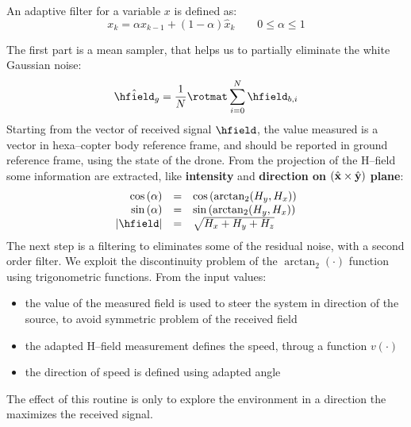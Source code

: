 An adaptive filter for a variable $x$ is defined as:
\[
x_k = \alpha x_{k-1} + (1-\alpha) \hat{x}_k \qquad 0 \leq \alpha \leq 1
\]

The first part is a mean sampler, that helps us to partially eliminate the white Gaussian noise:
\begin{equation}
	\hat{\hfield}_g = \dfrac{1}{N} \rotmat \sum\limits_{i=0}^{N} \hfield_{b,i}
\end{equation}
Starting from the vector of received signal $\hfield$, the value measured is a vector in hexa--copter body reference frame, and should be reported in ground reference frame, using the state of the drone. From the projection of the H--field some information are extracted, like \textbf{intensity} and \textbf{direction on} $(\hat{\mathbf{x}}\times\hat{\mathbf{y}})$ \textbf{plane}:
\begin{equation}
\begin{array}{rcl}
	\ccos{\alpha} & = & \ccos{\arctan_2(H_y,H_x)} \\
	\ssin{\alpha} & = & \ssin{\arctan_2(H_y,H_x)} \\
	\abs{\hfield} & = & \sqrt{H_x+H_y+H_z}
\end{array}
\end{equation}
The next step is a filtering to eliminates some of the residual noise, with a second order filter. We exploit the discontinuity problem of the ${\arctan_2(\cdot)}$ function using trigonometric functions. From the input values:
\begin{itemize}
\item the value of the measured field is used to steer the system in direction of the source, to avoid symmetric problem of the received field
\item the adapted H--field measurement defines the speed, throug a function ${v(\cdot)}$
\item the direction of speed is defined using adapted angle
\end{itemize}
The effect of this routine is only to explore the environment in a direction the maximizes the received signal.

